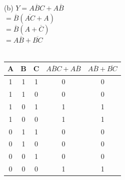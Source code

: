 \documentclass[12pt,a4paper]{report}
\newcommand*{\bl}{\overline{B}}
\newcommand*{\cl}{\overline{C}}
\begin{document}
\begin{normalsize}
(b) $ Y = \overline{ABC} + A\overline{B} $ \\
$ = \bl{}(\overline{AC} + A) $ \\
$ = \bl{}(A + \cl{}) $ \\
$ = A\bl{} + \overline{BC} $ \\ \\
\begin{tabular}{|c|c|c|c|c|}
A & B & C & $ \overline{ABC} + A\overline{B} $ & $ A\bl{} + \overline{BC} $ \\ 
\hline 
1 & 1 & 1 & 0 & 0 \\ 
\hline 
1 & 1 & 0 & 0 & 0 \\ 
\hline 
1 & 0 & 1 & 1 & 1 \\ 
\hline 
1 & 0 & 0 & 1 & 1 \\ 
\hline 
0 & 1 & 1 & 0 & 0 \\ 
\hline 
0 & 1 & 0 & 0 & 0 \\ 
\hline 
0 & 0 & 1 & 0 & 0 \\ 
\hline 
0 & 0 & 0 & 1 & 1 \\ 
\hline 
\end{tabular} \\ \\



\end{normalsize}
\end{document}
